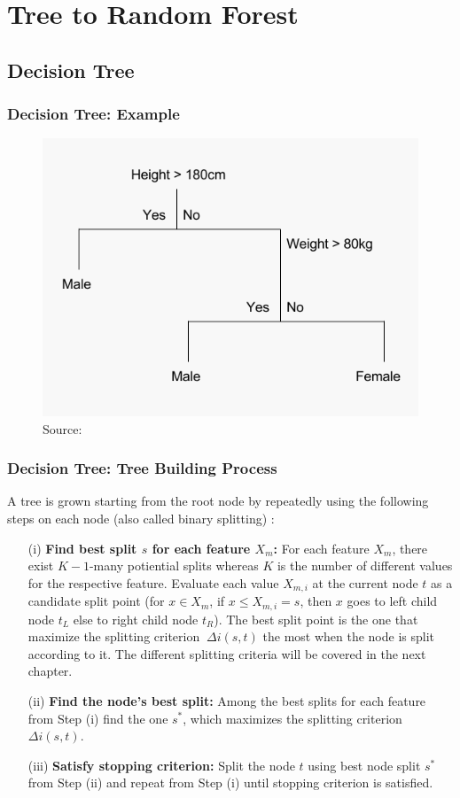 \section{Tree to Random Forest}
\subsection{Decision Tree}

\begin{frame}
	\frametitle{Decision Tree: Example}
	\begin{figure}		
		\includegraphics[height=0.7\textheight]{images/decision_tree_example.png}
		\caption{Source:\cite{james2013learning} }
	\end{figure}
\end{frame}

\begin{frame}
	\frametitle{Decision Tree: Tree Building Process}
	A tree is grown starting from the root node by repeatedly 
	using the following steps on each node (also called binary splitting) \cite{breiman1984classification}:
	\begin{enumerate}
		\item[(i)] \textbf{Find best split \(s\) for each feature \(X_{m}\):}
		For each feature \(X_{m}\), there exist \(K-1\)-many potiential splits whereas \(K\) is the number of different values for the respective feature.
		Evaluate each value \(X_{m,i}\) at the current node \(t\) as a candidate split point (for \(x \in X_{m}\), if \(x \leq X_{m,i}=s\),
		then \(x\) goes to left child node \(t_{L}\) else to right child node \(t_{R}\)).
		The best split point is the one that maximize the splitting criterion \(\ \Delta i(s,t) \) the most when the node is split according to it.
		The different splitting criteria will be covered in the next chapter.
		\item[(ii)] \textbf{Find the node’s best split:} Among the best splits for each feature from Step (i) find the one \(s^{*}\), which maximizes the splitting criterion \(\Delta i(s,t)\).
		\item[(iii)] \textbf{Satisfy stopping criterion:} Split the node \(t\) using best node split \(s^{*}\) from Step (ii) and 
		repeat from Step (i) until stopping criterion is satisfied. 
	\end{enumerate}
\end{frame}	

